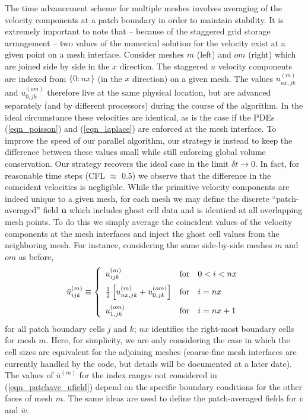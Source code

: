 \documentclass[11pt]{book}
\begin{document}
The time advancement scheme for multiple meshes involves averaging of the velocity components at a patch boundary in order to maintain stability. It is extremely important to note that -- because of the staggered grid storage arrangement -- two values of the numerical solution for the velocity exist at a given point on a mesh interface.  Consider meshes $m$ (left) and $om$ (right) which are joined side by side in the $x$ direction.  The staggered $u$ velocity components are indexed from $\{0\!:\!nx\}$ (in the $x$ direction) on a given mesh. The values $u^{(m)}_{nx,jk}$ and $u^{(om)}_{0,jk}$ therefore live at the same physical location, but are advanced separately (and by different processors) during the course of the algorithm.  In the ideal circumstance these velocities are identical, as is the case if the PDEs (\ref{eqn_poisson}) and (\ref{eqn_laplace}) are enforced at the mesh interface.  To improve the speed of our parallel algorithm, our strategy is instead to keep the difference between these values small while still enforcing global volume conservation.  Our strategy recovers the ideal case in the limit $\delta t \rightarrow 0$. In fact, for reasonable time steps (CFL $\approx$ 0.5) we observe that the difference in the coincident velocities is negligible.  While the primitive velocity components are indeed unique to a given mesh, for each mesh we may define the discrete ``patch-averaged'' field $\bar{\mathbf{u}}$ which includes ghost cell data and is identical at all overlapping mesh points.  To do this we simply average the coincident values of the velocity components at the mesh interfaces and inject the ghost cell values from the neighboring mesh.  For instance, considering the same side-by-side meshes $m$ and $om$ as before,
\begin{equation}
\label{eqn_patchave_ufield}
\bar{u}^{(m)}_{ijk} \equiv \left\{ \begin{array}{ll} u^{(m)}_{ijk} & \mbox{for}\quad 0<i<nx \vspace{0.2cm}\\
\frac{1}{2} \left[ u^{(m)}_{nx,jk} + u^{(om)}_{0,jk} \right] & \mbox{for}\quad i=nx \vspace{0.2cm}\\
u^{(om)}_{1,jk} & \mbox{for}\quad i=nx+1 \end{array} \right.
\end{equation}
for all patch boundary cells $j$ and $k$; $nx$ identifies the right-most boundary cells for mesh $m$. Here, for simplicity, we are only considering the case in which the cell sizes are equivalent for the adjoining meshes (coarse-fine mesh interfaces are currently handled by the code, but details will be documented at a later date).  The values of $\bar{u}^{(m)}$ for the index ranges not considered in (\ref{eqn_patchave_ufield}) depend on the specific boundary conditions for the other faces of mesh $m$.  The same ideas are used to define the patch-averaged fields for $\bar{v}$ and $\bar{w}$.
\end{document}
